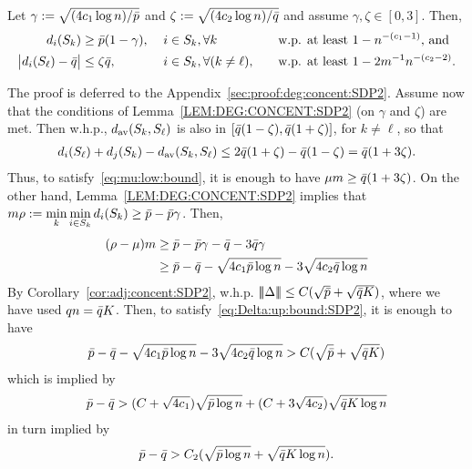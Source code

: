 \begin{lem}\label{LEM:DEG:CONCENT:SDP2}
  Let $\gamma := \sqrt{ (4c_1 \log n)/ \bar{p}}$ and $\zeta := \sqrt{ (4c_2 \log n)/ \bar{q}}$ and assume $\gamma,\zeta \in [0,3]$. Then,%
  \begin{alignat*}{4}
    d_{i}(S_{k}) &\ge \bar{p}(1-\gamma), 
      &&\; i \in S_{k}, \forall k 
      &&\quad \text{w.p. at least $1 - n^{-(c_1-1)}$, and} \\
      \big| d_{i}(S_{\ell}) - \bar{q} \big| &\le \zeta \bar{q}, 
      &&\; i \in S_{k}, \forall (k \neq \ell),
      &&\quad \text{w.p. at least $1-2 m^{-1}n^{-(c_2-2)}$}.
  \end{alignat*}
\end{lem}
The proof is deferred to the Appendix~\ref{sec:proof:deg:concent:SDP2}.
Assume now that the conditions of Lemma~\ref{LEM:DEG:CONCENT:SDP2} (on $\gamma$ and $\zeta$) are met.
Then w.h.p., $d_{\text{av}}(S_{k},S_{\ell})$ is also in $[\bar{q} (1-\zeta),\bar{q} (1+\zeta)]$, for $k \neq \ell$, so that 
\begin{align*}
  d_{i}(S_{\ell})  + d_{j}(S_{k}) - d_{\text{av}}(S_{k},S_{\ell}) \le 2\bar{q}(1+\zeta)-\bar{q}(1-\zeta) = \bar{q}(1+3\zeta).
\end{align*}
Thus, to satisfy~\eqref{eq:mu:low:bound}, it is enough to have $\mu m \ge \bar{q} (1+3\zeta)$. On the other hand, Lemma~\ref{LEM:DEG:CONCENT:SDP2} implies that $\displaystyle m \rho := \min_k \min_{i \in S_{k}} d_{i}(S_{k}) \ge \bar{p} - \bar{p} \gamma$. Then,
\begin{align*}
  (\rho-\mu) m &\ge \bar{p} - \bar{p}\gamma - \bar{q} - 3\bar{q} \gamma \\
         &\ge \bar{p} - \bar{q} - \sqrt{4c_1\bar{p} \log n} - 3 \sqrt{4c_2 \bar{q} \log n}  
\end{align*}
By Corollary~\ref{cor:adj:concent:SDP2}, w.h.p. $|\!|\!|\Delta|\!|\!| \le C(\sqrt{\bar{p}} + \sqrt{\bar{q} K})$, where we have used $q n = \bar{q} K$. Then, to satisfy~\eqref{eq:Delta:up:bound:SDP2}, it is enough to have
\begin{align*}
   \bar{p} - \bar{q} - \sqrt{4c_1\bar{p} \log n} - 3 \sqrt{4c_2 \bar{q} \log n} > C(\sqrt{\bar{p}} + \sqrt{\bar{q} K})
\end{align*}
which is implied by
\begin{align*}
  \bar{p} - \bar{q}> (C+\sqrt{4c_1})\sqrt{\bar{p} \log n} + (C+3\sqrt{4c_2})\sqrt{\bar{q} K \log n}
\end{align*}
in turn implied by
\begin{align}\label{eq:SDP2:log:cond}
  \bar{p} - \bar{q} > C_2 ( \sqrt{\bar{p} \log n} + \sqrt{ \bar{q} K \log n}).
\end{align}

